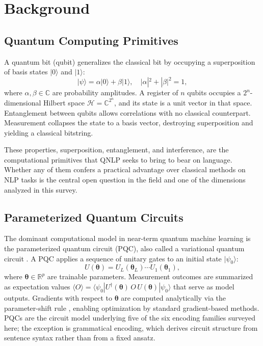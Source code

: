 \documentclass{ieeeaccess}
\begin{document}
\section{Background}
\label{sec:background}

\subsection{Quantum Computing Primitives}

A quantum bit (qubit) generalizes the classical bit by occupying a superposition of basis states $|0\rangle$ and $|1\rangle$:
\begin{equation}
|\psi\rangle = \alpha|0\rangle + \beta|1\rangle, \quad |\alpha|^2 + |\beta|^2 = 1,
\end{equation}
where $\alpha, \beta \in \mathbb{C}$ are probability amplitudes. A register of $n$ qubits occupies a $2^n$-dimensional Hilbert space $\mathcal{H} = \mathbb{C}^{2^n}$, and its state is a unit vector in that space. Entanglement between qubits allows correlations with no classical counterpart. Measurement collapses the state to a basis vector, destroying superposition and yielding a classical bitstring.

These properties, superposition, entanglement, and interference, are the computational primitives that QNLP seeks to bring to bear on language. Whether any of them confers a practical advantage over classical methods on NLP tasks is the central open question in the field and one of the dimensions analyzed in this survey.

\subsection{Parameterized Quantum Circuits}

The dominant computational model in near-term quantum machine learning is the parameterized quantum circuit (PQC), also called a variational quantum circuit \cite{cerezo2021variational}. A PQC applies a sequence of unitary gates to an initial state $|\psi_0\rangle$:
\begin{equation}
U(\boldsymbol{\theta}) = U_L(\boldsymbol{\theta}_L) \cdots U_1(\boldsymbol{\theta}_1),
\end{equation}
where $\boldsymbol{\theta} \in \mathbb{R}^p$ are trainable parameters. Measurement outcomes are summarized as expectation values $\langle O \rangle = \langle \psi_0 | U^\dagger(\boldsymbol{\theta})\, O\, U(\boldsymbol{\theta}) | \psi_0 \rangle$ that serve as model outputs. Gradients with respect to $\boldsymbol{\theta}$ are computed analytically via the parameter-shift rule \cite{mitarai2018quantum, schuld2019evaluating}, enabling optimization by standard gradient-based methods. PQCs are the circuit model underlying five of the six encoding families surveyed here; the exception is grammatical encoding, which derives circuit structure from sentence syntax rather than from a fixed ansatz.
\end{document}

